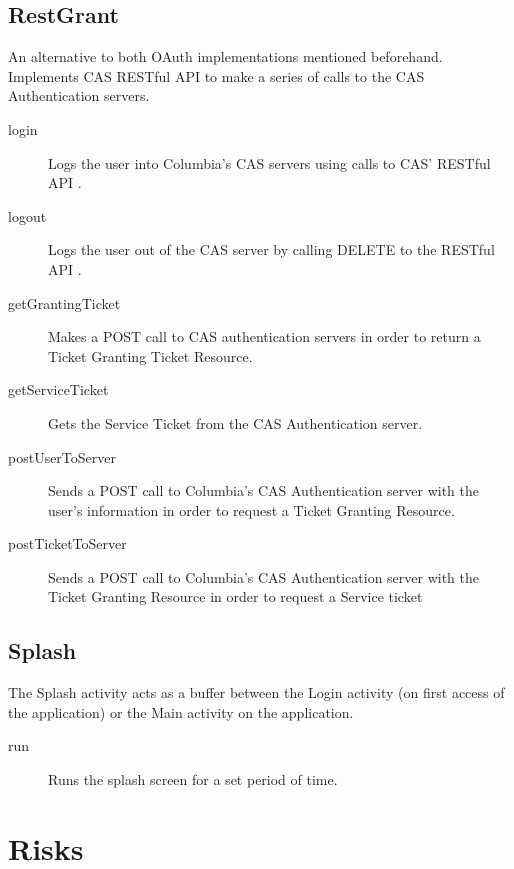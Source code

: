 \documentclass{article}
\begin{document}
\subsection{RestGrant}
An alternative to both OAuth implementations mentioned beforehand. Implements CAS RESTful 
API to make a series of calls to the CAS Authentication servers.
\begin{description}
    \item[login] Logs the user into Columbia's CAS servers using calls to CAS' RESTful API
                 .
    \item[logout] Logs the user out of the CAS server by calling DELETE to the RESTful API
                  .
    \item[getGrantingTicket] Makes a POST call to CAS authentication servers in order to 
                             return a Ticket Granting Ticket Resource.
    \item[getServiceTicket] Gets the Service Ticket from the CAS Authentication server.
    \item[postUserToServer] Sends a POST call to Columbia's CAS Authentication server
                            with the user's information in order to request a Ticket 
                            Granting Resource.
    \item[postTicketToServer] Sends a POST call to Columbia's CAS Authentication server 
                              with the Ticket Granting Resource in order to request a 
                              Service ticket
\end{description}

\subsection{Splash} 
The Splash activity acts as a buffer between the Login activity (on first access of the 
application) or the Main activity on the application. 
\begin{description}
    \item[run] Runs the splash screen for a set period of time.
\end{description}

\section{Risks}
\end{document}

